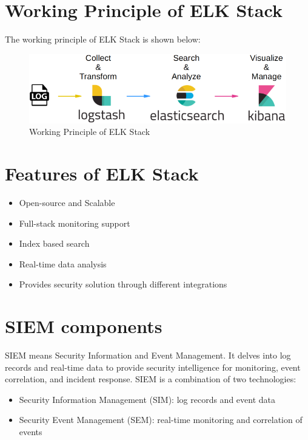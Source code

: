 \documentclass{report}
\begin{document}
\section{Working Principle of ELK Stack}

The working principle of ELK Stack is shown below:

\begin{figure}[h]
	\centering
	\includegraphics[width=\textwidth]{Images/ELK_Working_Principle.png}
	\caption{Working Principle of ELK Stack}
	\label{fig:Working Principle of ELK Stack}
\end{figure}

\section{Features of ELK Stack}
\begin{itemize}
	\item Open-source and Scalable
	\item Full-stack monitoring support
	\item Index based search
	\item Real-time data analysis
	\item Provides security solution through different integrations
\end{itemize}

\section{SIEM components}
SIEM means Security Information and Event Management. It delves into log records and real-time data to 
provide security intelligence for monitoring, event correlation, and incident response. SIEM is a combination of two technologies:
\begin{itemize}
	\item Security Information Management (SIM): log records and event data
	\item Security Event Management (SEM): real-time monitoring and correlation of events
\end{itemize}
\end{document}

